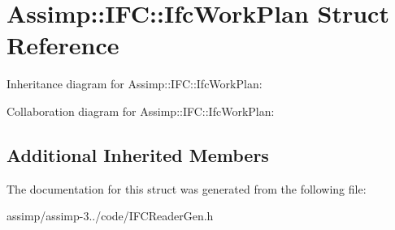 \hypertarget{struct_assimp_1_1_i_f_c_1_1_ifc_work_plan}{\section{Assimp\+:\+:I\+F\+C\+:\+:Ifc\+Work\+Plan Struct Reference}
\label{struct_assimp_1_1_i_f_c_1_1_ifc_work_plan}
}


Inheritance diagram for Assimp\+:\+:I\+F\+C\+:\+:Ifc\+Work\+Plan\+:


Collaboration diagram for Assimp\+:\+:I\+F\+C\+:\+:Ifc\+Work\+Plan\+:
\subsection*{Additional Inherited Members}


The documentation for this struct was generated from the following file\+:\begin{DoxyCompactItemize}
\item 
assimp/assimp-\/3../code/I\+F\+C\+Reader\+Gen.\+h\end{DoxyCompactItemize}
